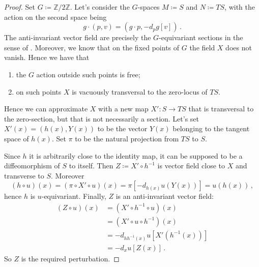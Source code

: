 \documentclass[a4paper, 11pt]{amsart}
\theoremstyle{plain}
\theoremstyle{definition}
\newcommand{\Z}{\mathbb{Z}}
\begin{document}
\begin{proof}
	Set $G \coloneqq \Z/2\Z$. Let's consider the $G$-spaces $M \coloneqq S$ and $N \coloneqq TS$, with the action on the second space being
	\[
		g\cdot(p,v) = (g\cdot p, - d_pg[v])\,.
	\]
	The anti-invariant vector field are precisely the $G$-equivariant sections in the sense of . Moreover, we know that on the fixed points of $G$ the field $X$ does not vanish. Hence we have that
	\begin{enumerate}
		\item the $G$ action outside such points is free;
		\item on such points $X$ is vacuously transversal to the zero-locus of $TS$.
	\end{enumerate}
	
	Hence we can approximate $X$ with a new map $X' \colon S \to TS$ that is transversal to the zero-section, but that is not necessarily a section. Let's set $X'(x) = (h(x), Y(x))$ to be the vector $Y(x)$ belonging to the tangent space of $h(x)$. Set $\pi$ to be the natural projection from $TS$ to $S$.
	
	Since $h$ it is arbitrarily close to the identity map, it can be supposed to be a diffeomorphism of $S$ to itself. Then $Z \coloneqq X' \circ h^{-1}$ is vector field close to $X$ and transverse to $S$. Moreover
	\[
		(h \circ u)(x) = (\pi \circ X' \circ u)(x) = \pi[- d_{h(x)}u(Y(x))] =  u(h(x))\,,
	\]
	hence $h$ is $u$-equivariant. Finally, $Z$ is an anti-invariant vector field:
	\[
	\begin{split}
		(Z \circ u)(x) &= (X' \circ h^{-1} \circ u)(x)\\
		&= (X' \circ u \circ h^{-1})(x) \\
		&=- d_{hh^{-1}(x)}u[X'(h^{-1}(x))]\\
		&= - d_xu[Z(x)]\,.
	\end{split}
	\]
	So $Z$ is the required perturbation.
\end{proof}
\end{document}
